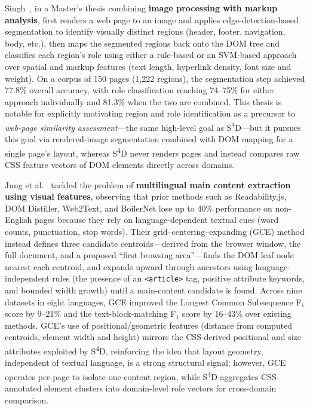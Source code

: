 Singh~\cite{singh2014regions}, in a Master's thesis combining \textbf{image processing with markup analysis}, first renders a web page to an image and applies edge-detection-based segmentation to identify visually distinct regions (header, footer, navigation, body, etc.), then maps the segmented regions back onto the DOM tree and classifies each region's role using either a rule-based or an SVM-based approach over spatial and markup features (text length, hyperlink density, font size and weight). On a corpus of 150 pages (1,222 regions), the segmentation step achieved 77.8\% overall accuracy, with role classification reaching 74--75\% for either approach individually and 81.3\% when the two are combined. This thesis is notable for explicitly motivating region and role identification as a precursor to \emph{web-page similarity assessment}---the same high-level goal as S\textsuperscript{4}D---but it pursues this goal via rendered-image segmentation combined with DOM mapping for a single page's layout, whereas S\textsuperscript{4}D never renders pages and instead compares raw CSS feature vectors of DOM elements directly across domains.

Jung et al.~\cite{jung2021dontread} tackled the problem of \textbf{multilingual main content extraction using visual features}, observing that prior methods such as Readability.js, DOM Distiller, Web2Text, and BoilerNet lose up to 40\% performance on non-English pages because they rely on language-dependent textual cues (word counts, punctuation, stop words). Their grid--centering--expanding (GCE) method instead defines three candidate centroids---derived from the browser window, the full document, and a proposed ``first browsing area''---finds the DOM leaf node nearest each centroid, and expands upward through ancestors using language-independent rules (the presence of an \texttt{<article>} tag, positive attribute keywords, and bounded width growth) until a main-content candidate is found. Across nine datasets in eight languages, GCE improved the Longest Common Subsequence F$_1$ score by 9--21\% and the text-block-matching F$_1$ score by 16--43\% over existing methods. GCE's use of positional/geometric features (distance from computed centroids, element width and height) mirrors the CSS-derived positional and size attributes exploited by S\textsuperscript{4}D, reinforcing the idea that layout geometry, independent of textual language, is a strong structural signal; however, GCE operates per-page to isolate one content region, while S\textsuperscript{4}D aggregates CSS-annotated element clusters into domain-level role vectors for cross-domain comparison.

